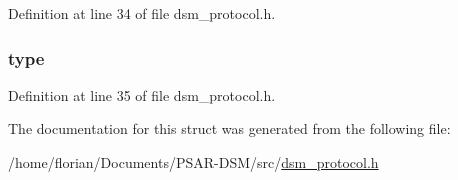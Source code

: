 Definition at line 34 of file dsm\+\_\+protocol.\+h.

\subsubsection[{\texorpdfstring{type}{type}}]{ type}\hypertarget{structdsm__message__s_a14b6c37fbb5fc6cb767b380c417830bd}{}\label{structdsm__message__s_a14b6c37fbb5fc6cb767b380c417830bd}


Definition at line 35 of file dsm\+\_\+protocol.\+h.



The documentation for this struct was generated from the following file\+:\begin{DoxyCompactItemize}
\item 
/home/florian/\+Documents/\+P\+S\+A\+R-\/\+D\+S\+M/src/\hyperlink{dsm__protocol_8h}{dsm\+\_\+protocol.\+h}\end{DoxyCompactItemize}
